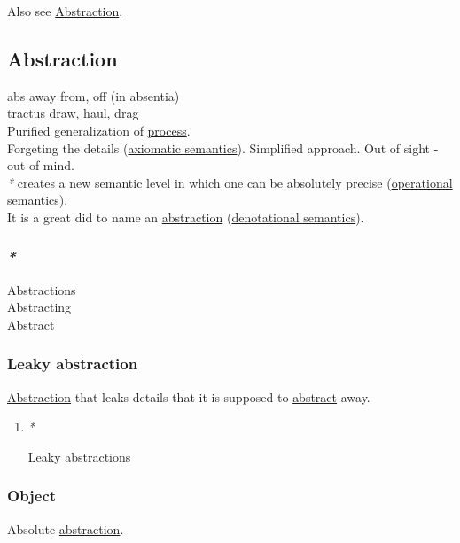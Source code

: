 \documentclass[a4paper,14pt,oneside]{book}
\begin{document}
Also see \hyperref[orgf49d7a2]{Abstraction}.\\

\subsection{\label{orgf49d7a2}Abstraction}
\label{sec:org0d91b35}
abs away from, off (in absentia)\\
tractus draw, haul, drag\\

Purified generalization of \hyperref[orgc8d4f36]{process}.\\

Forgeting the details (\hyperref[orgb28d25e]{axiomatic semantics}). Simplified approach. Out of sight - out of mind.\\

\emph{*} creates a new semantic level in which one can be absolutely precise (\hyperref[org43ce6f6]{operational semantics}).\\

It is a great did to name an \hyperref[orgf49d7a2]{abstraction} (\hyperref[org1e43a1f]{denotational semantics}).\\

\subsubsection{\emph{*}}
\label{sec:orge08b3e6}

\label{org9c4a5fd}Abstractions\\
\label{org21b0e91}Abstracting\\
\label{orgd5905e0}Abstract\\

\subsubsection{\label{orgeac4941}Leaky abstraction}
\label{sec:orgd085f00}
\hyperref[orgf49d7a2]{Abstraction} that leaks details that it is supposed to \hyperref[orgd5905e0]{abstract} away.\\

\begin{enumerate}
\item \emph{*}
\label{sec:orgcec5320}

\label{orge6e9b55}Leaky abstractions\\
\end{enumerate}

\subsubsection{\label{orgf695f6d}Object}
\label{sec:org3bb1154}
Absolute \hyperref[orgf49d7a2]{abstraction}.\\
\end{document}
